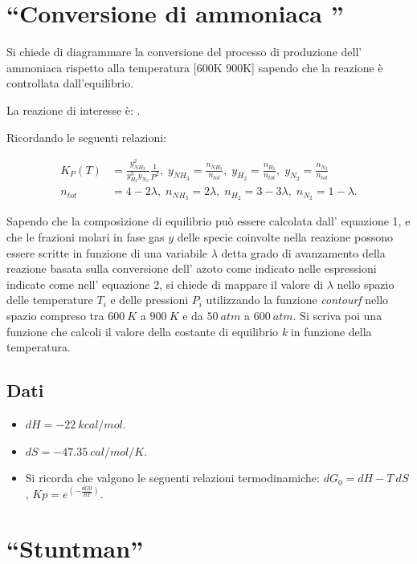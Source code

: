 \documentclass[oneside]{article}
\begin{document}
\section{``Conversione di ammoniaca ''}
Si chiede di diagrammare la conversione del processo di produzione dell' ammoniaca
rispetto alla temperatura [600K 900K]  sapendo che la reazione è controllata
dall’equilibrio.

La reazione di interesse è: .

Ricordando le seguenti relazioni:

\begin{align}
   K_P (T)  &= \frac{y_{NH_3}^2}{y_{H_2}^{3} y_{N_2}} \frac{1}{P^2}, \; y_{NH_3} =
   \frac{n_{NH_3}}{n_{tot}}, \; y_{H_2}  = \frac{n_{H_2}}{n_{tot}}, \; y_{N_2}  =
   \frac{n_{N_2}}{n_{tot}} \\
   n_{tot} &= 4 - 2\lambda, \; n_{NH_3} = 2\lambda, \; n_{H_2} = 3 - 3\lambda, \; n_{N_2}
   = 1 - \lambda.
\end{align}

Sapendo che la composizione di equilibrio può essere calcolata dall' equazione 1, e che
le frazioni molari in fase gas $y$ delle specie coinvolte nella reazione possono essere
scritte in funzione di una variabile $\lambda$ detta grado di avanzamento della reazione
basata sulla conversione dell' azoto come indicato nelle espressioni indicate come nell'
equazione 2, si chiede di mappare il valore di $\lambda$ nello spazio delle temperature
$T_i$ e delle pressioni $P_i$ utilizzando la funzione {\it contourf} nello spazio
compreso tra $600\:K$ a $900\:K$ e da $50\:atm$ a $600\:atm$. Si scriva poi una funzione
che calcoli il valore della costante di equilibrio {\it k} in funzione della temperatura.

\subsection*{Dati}
\begin{itemize}
   \item $dH = -22 \: kcal/mol$.
   \item $dS = -47.35 \: cal/mol/K$.
   \item Si ricorda che valgono le seguenti relazioni termodinamiche: $dG_{0} = dH - T \:
      dS$, $Kp = e^{\left( -\frac{dG0}{RT} \right)}$.
\end{itemize}

\section{``Stuntman''}
\end{document}
